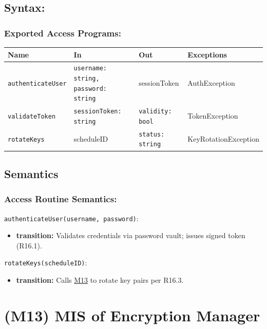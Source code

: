 \documentclass[12pt, titlepage]{article}
\begin{document}
\subsection{Syntax:}

\subsubsection{Exported Access Programs:}

\begin{tabular}{|l|l|l|l|}
\hline
\textbf{Name} & \textbf{In} & \textbf{Out} & \textbf{Exceptions} \\ \hline
\texttt{authenticateUser} & \texttt{username: string, password: string} & sessionToken & AuthException \\ 
\texttt{validateToken} & \texttt{sessionToken: string} & \texttt{validity: bool} & TokenException \\ 
\texttt{rotateKeys} & scheduleID & \texttt{status: string} & KeyRotationException \\ \hline
\end{tabular}

\subsection{Semantics}

\subsubsection{Access Routine Semantics:}

\noindent\texttt{authenticateUser(username, password)}:
\begin{itemize}
\item \textbf{transition:} Validates credentials via password vault; issues signed token (R16.1).
\end{itemize}

\noindent\texttt{rotateKeys(scheduleID)}:
\begin{itemize}
\item \textbf{transition:} Calls \hyperref[M13]{M13} to rotate key pairs per R16.3.
\end{itemize}



\section{(M13) MIS of Encryption Manager} \label{M13}
\label{MIS:M13}
\end{document}
